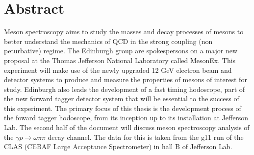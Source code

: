 \chapter{Abstract}

Meson spectroscopy aims to study the masses and decay processes of mesons to better understand the mechanics of QCD in the strong coupling (non peturbative) regime.
 The Edinburgh group are spokespersons on a major new proposal at the Thomas Jefferson National Laboratory called MesonEx.
   This experiment will make use of the newly upgraded 12 GeV electron beam  and detector systems to produce and measure the properties of mesons of interest for study.
    Edinburgh also leads the development of a fast timing hodoscope, part of the new forward tagger detector system that will be essential to the success of this experiment. 
    The primary focus of this thesis is the development process of the foward tagger hodoscope, from its inception up to its installation at Jefferson Lab. 
    The second half of the document will discuss meson spectroscopy analysis of the $\gamma p \rightarrow \omega\pi\pi$ decay channel.
    The data for this is taken from the g11 run of the CLAS (CEBAF Large Acceptance Spectrometer) in hall B of Jefferson Lab.

